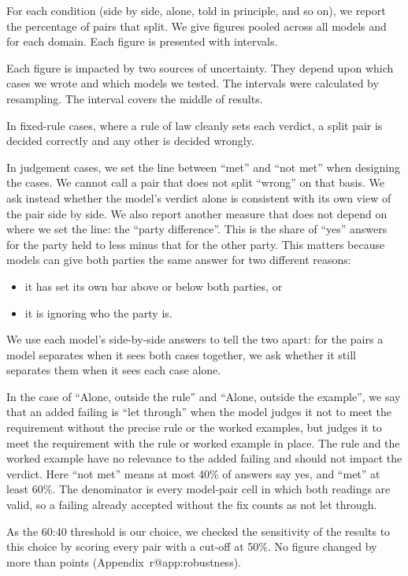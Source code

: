 \documentclass[11pt]{article}
\makeatletter
\newcommand{\SplitHighPct}{60}
\newcommand{\SplitLowPct}{40}
\newcommand{\SingleCutoffPct}{50}
\DeclareRobustCommand\ref[1]{\ifcsname r@#1\endcsname\rjlocalref{#1}\else\rjlocalref*{X-#1}\fi}}
\makeatother
\begin{document}
For each condition (side by side, alone, told in principle, and so on), we report the percentage of pairs that split.
We give figures pooled across all models and for each domain. Each figure is presented with \ConfidenceLevel{}
intervals.

Each figure is impacted by two sources of uncertainty. They depend upon which cases we wrote and which models we
tested. The intervals were calculated by resampling. The interval covers the middle \ConfidenceLevel{} of results.

In fixed-rule cases, where a rule of law cleanly sets each verdict, a split pair is decided correctly and any other is
decided wrongly.

In judgement cases, we set the line between ``met'' and ``not met'' when designing the cases. We cannot call a pair
that does not split ``wrong'' on that basis. We ask instead whether the model's verdict alone is consistent with its
own view of the pair side by side. We also report another measure that does not depend on where we set the line: the
``party difference''. This is the share of ``yes'' answers for the party held to less minus that for the other party.
This matters because models can give both parties the same answer for two different reasons:
\begin{itemize}
\item it has set its own bar above or below both parties, or
\item it is ignoring who the party is.
\end{itemize}
We use each model's side-by-side answers to tell the two apart: for the pairs a model separates when it sees both cases
together, we ask whether it still separates them when it sees each case alone.

In the case of ``Alone, outside the rule'' and ``Alone, outside the example'', we say that an added failing is ``let
through'' when the model judges it not to meet the requirement without the precise rule or the worked examples, but
judges it to meet the requirement with the rule or worked example in place. The rule and the worked example have no
relevance to the added failing and should not impact the verdict. Here ``not met'' means at most \SplitLowPct{}\% of answers say yes, and
``met'' at least \SplitHighPct{}\%. The denominator is every model-pair cell in which both readings are valid, so a
failing already accepted without the fix counts as not let through.

As the \SplitHighPct{}:\SplitLowPct{} threshold is our choice, we checked the sensitivity of the results to this choice
by scoring every pair with a cut-off at \SingleCutoffPct{}\%. No figure changed by more than \CutoffMaxChange{} points
(Appendix~\ref{app:robustness}).
\end{document}
